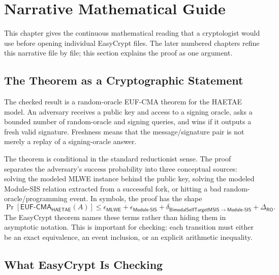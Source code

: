\documentclass[11pt]{report}
\newcommand{\PrEC}[1]{\Pr\!\left[#1\right]}
\newcommand{\ROM}{\mathsf{RO}}
\newcommand{\HAETAE}{\mathsf{HAETAE}}
\newcommand{\MLWE}{\mathsf{MLWE}}
\newcommand{\MSIS}{\mathsf{Module\mbox{-}SIS}}
\newcommand{\BMSIS}{\mathsf{BimodalSelfTargetMSIS}}
\theoremstyle{definition}
\theoremstyle{plain}
\theoremstyle{definition}
\begin{document}
\chapter*{Narrative Mathematical Guide}

This chapter gives the continuous mathematical reading that a cryptologist
would use before opening individual EasyCrypt files.  The later numbered
chapters refine this narrative file by file; this section explains the proof as
one argument.

\section*{The Theorem as a Cryptographic Statement}

The checked result is a random-oracle EUF-CMA theorem for the HAETAE model.  An
adversary receives a public key and access to a signing oracle, asks a bounded
number of random-oracle and signing queries, and wins if it outputs a fresh
valid signature.  Freshness means that the message/signature pair is not merely
a replay of a signing-oracle answer.

The theorem is conditional in the standard reductionist sense.  The proof
separates the adversary's success probability into three conceptual sources:
solving the modeled MLWE instance behind the public key, solving the modeled
Module-SIS relation extracted from a successful fork, or hitting a bad
random-oracle/programming event.  In symbols, the proof has the shape
\[
  \PrEC{\mathsf{EUF\mbox{-}CMA}_{\HAETAE}(A)}
  \le
  \epsilon_{\MLWE}
  + \epsilon_{\MSIS}
  + \delta_{\BMSIS\to\MSIS}
  + \Delta_{\ROM}.
\]
The EasyCrypt theorem names these terms rather than hiding them in asymptotic
notation.  This is important for checking: each transition must either be an
exact equivalence, an event inclusion, or an explicit arithmetic inequality.

\section*{What EasyCrypt Is Checking}
\end{document}

